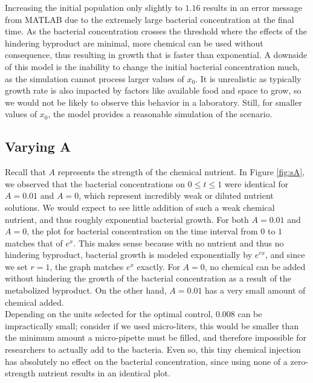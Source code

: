 \documentclass[10pt]{article}
\theoremstyle{exmp}
\begin{document}
\noindent Increasing the initial population only slightly to $1.16$ results in an error message from MATLAB due to the extremely large bacterial concentration at the final time. As the bacterial concentration crosses the threshold where the effects of the hindering byproduct are minimal, more chemical can be used without consequence, thus resulting in growth that is faster than exponential. A downside of this model is the inability to change the initial bacterial concentration much, as the simulation cannot process larger values of $x_0$. It is unrealistic as typically growth rate is also impacted by factors like available food and space to grow, so we would not be likely to observe this behavior in a laboratory. Still, for smaller values of $x_0$, the model provides a reasonable simulation of the scenario.

\subsection{Varying A}

\noindent Recall that $A$ represents the strength of the chemical nutrient. In Figure \ref{fig:sA}, we observed that the bacterial concentrations on $0 \leq t \leq 1$ were identical for $A = 0.01$ and $A = 0$, which represent incredibly weak or diluted nutrient solutions. We would expect to see little addition of such a weak chemical nutrient, and thus roughly exponential bacterial growth. For both $A = 0.01$ and $A = 0$, the plot for bacterial concentration on the time interval from $0$ to $1$ matches that of $e^x$. This makes sense because with no nutrient and thus no hindering byproduct, bacterial growth is modeled exponentially by $e^{rx}$, and since we set $r = 1$, the graph matches $e^x$ exactly. For $A = 0$, no chemical can be added without hindering the growth of the bacterial concentration as a result of the metabolized byproduct. On the other hand, $A = 0.01$ has a very small amount of chemical added.  \\

\noindent Depending on the units selected for the optimal control, $0.008$ can be impractically small; consider if we used micro-liters, this would be smaller than the minimum amount a micro-pipette must be filled, and therefore impossible for researchers to actually add to the bacteria. Even so, this tiny chemical injection has absolutely no effect on the bacterial concentration, since using none of a zero-strength nutrient results in an identical plot. \\
\end{document}
